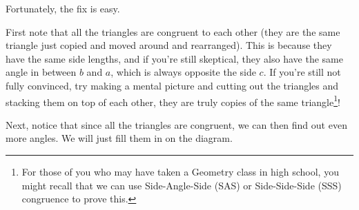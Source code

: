 Fortunately, the fix is easy. 
\begin{center}
\end{center}

First note that all the triangles are congruent to each other (they are the same triangle just copied and moved around and rearranged). This is because they have the same side lengths, and if you're still skeptical, they also have the same angle in between $b$ and $a$, which is always opposite the side $c$. If you're still not fully convinced, try making a mental picture and cutting out the triangles and stacking them on top of each other, they are truly copies of the same triangle\footnote{For those of you who may have taken a Geometry class in high school, you might recall that we can use Side-Angle-Side (SAS) or Side-Side-Side (SSS) congruence to prove this.}!

Next, notice that since all the triangles are congruent, we can then find out even more angles. We will just fill them in on the diagram. 

